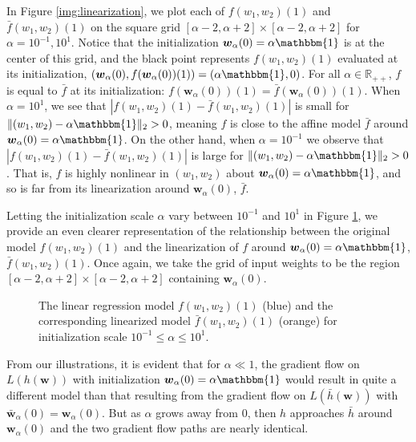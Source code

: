 \documentclass{article}
\begin{document}
In Figure \ref{img:linearization}, we plot each of $f(w_1, w_2)(1)$ and $\bar{f}(w_1, w_2)(1)$ on the square grid $[\alpha - 2, \alpha + 2] \times [\alpha - 2, \alpha + 2]$ for $\alpha = 10^{-1}, 10^1$. Notice that the initialization $\boldsymbol{w}_{\alpha}(0) = \alpha \mathbbm{1}$ is at the center of this grid, and the black point represents $f(w_1, w_2)(1)$ evaluated at its initialization, $(\boldsymbol{w}_{\alpha}(0), f(\boldsymbol{w}_{\alpha}(0))(1)) = (\alpha \mathbbm{1}, 0)$. For all $\alpha \in \mathbb{R}_{++}$, $f$ is equal to $\bar{f}$ at its initialization: $f(\boldsymbol{w}_{\alpha}(0))(1) = \bar{f}(\boldsymbol{w}_{\alpha}(0))(1)$. When $\alpha = 10^1$, we see that $|f(w_1, w_2)(1) - \bar{f}(w_1, w_2)(1) |$ is small for $\| (w_1, w_2) - \alpha \mathbbm{1} \|_2 > 0$, meaning $f$ is close to the affine model $\bar{f}$ around $\boldsymbol{w}_{\alpha}(0) = \alpha \mathbbm{1}$. On the other hand, when $\alpha = 10^{-1}$ we observe that $|f(w_1, w_2)(1) - \bar{f}(w_1, w_2)(1)|$ is large for $\| (w_1, w_2) - \alpha \mathbbm{1} \|_2 > 0$. That is, $f$ is highly nonlinear in $(w_1, w_2)$ about $\boldsymbol{w}_{\alpha}(0) = \alpha \mathbbm{1}$, and so is far from its linearization around $\boldsymbol{w}_{\alpha}(0)$, $\bar{f}$.

Letting the initialization scale $\alpha$ vary between $10^{-1}$ and $10^{1}$ in Figure \ref{gif:linearization}, we provide an even clearer representation of the relationship between the original model $f(w_1, w_2)(1)$ and the linearization of $f$ around $\boldsymbol{w}_{\alpha}(0) = \alpha \mathbbm{1}$, $\bar{f}(w_1, w_2)(1)$. Once again, we take the grid of input weights to be the region $[\alpha - 2, \alpha + 2] \times [\alpha - 2, \alpha + 2]$ containing $\boldsymbol{w}_{\alpha}(0)$.

\begin{figure}[H]
\caption{The linear regression model $f(w_1, w_2)(1)$ (blue) and the corresponding linearized model $\bar{f}(w_1, w_2)(1)$ (orange) for initialization scale $10^{-1} \leq \alpha \leq 10^1$.}\label{gif:linearization}
\end{figure}

From our illustrations, it is evident that for $\alpha \ll 1$, the gradient flow on $L(h(\boldsymbol{w}))$ with initialization $\boldsymbol{w}_{\alpha}(0) = \alpha \mathbbm{1}$ would result in quite a different model than that resulting from the gradient flow on $L(\bar{h}(\boldsymbol{w}))$ with $\boldsymbol{\bar{w}}_{\alpha}(0) = \boldsymbol{w}_{\alpha}(0)$. But as $\alpha$ grows away from $0$, then $h$ approaches $\bar{h}$ around $\boldsymbol{w}_{\alpha}(0)$ and the two gradient flow paths are nearly identical.
\end{document}
